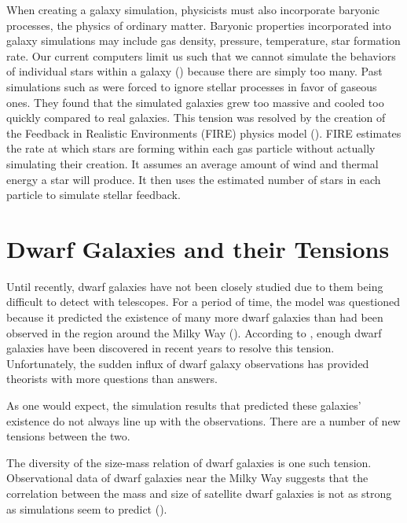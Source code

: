 
When creating a galaxy simulation, physicists must also incorporate baryonic processes, the physics of ordinary matter. Baryonic properties incorporated into galaxy simulations may include gas density, pressure, temperature, star formation rate. Our current computers limit us such that we cannot simulate the behaviors of individual stars within a galaxy (\cite{feldmannFIREboxSimulatingGalaxies2022}) because there are simply too many. Past simulations such as \cite{bournaudISMPropertiesHydrodynamic2010} were forced to ignore stellar processes in favor of gaseous ones. They found that the simulated galaxies grew too massive and cooled too quickly compared to real galaxies. This tension was resolved by the creation of the Feedback in Realistic Environments (FIRE) physics model (\cite{hopkinsFIRE2SimulationsPhysics2018}). FIRE estimates the rate at which stars are forming within each gas particle without actually simulating their creation. It assumes an average amount of wind and thermal energy a star will produce. It then uses the estimated number of stars in each particle to simulate stellar feedback.

\section{Dwarf Galaxies and their Tensions}
Until recently, dwarf galaxies have not been closely studied due to them being difficult to detect with telescopes. For a period of time, the \lcdm\* model was questioned because it predicted the existence of many more dwarf galaxies than had been observed in the region around the Milky Way (\cite{salesBaryonicSolutionsChallenges2022}). According to \cite{salesBaryonicSolutionsChallenges2022}, enough dwarf galaxies have been discovered in recent years to resolve this tension. Unfortunately, the sudden influx of dwarf galaxy observations has provided theorists with more questions than answers. 

As one would expect, the simulation results that predicted these galaxies' existence do not always line up with the observations. There are a number of new tensions between the two. 


The diversity of the size-mass relation of dwarf galaxies is one such tension. Observational data of dwarf galaxies near the Milky Way suggests that the correlation between the mass and size of satellite dwarf galaxies is not as strong as simulations seem to predict (\cite{salesBaryonicSolutionsChallenges2022}). 


